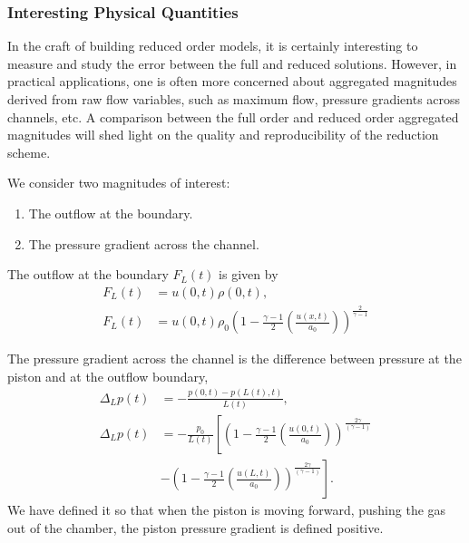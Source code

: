 \documentclass[../../thesis.tex]{subfiles}
\newcommand{\pexp}{\ensuremath{\frac{2\gamma}{\left(\gamma-1\right)}}}
\begin{document}

\subsubsection{Interesting Physical Quantities}
In the craft of building reduced order models, it is certainly interesting to measure and study the error between the full and reduced solutions. 
However, in practical applications, one is often more concerned about aggregated magnitudes derived from raw flow variables, such as maximum flow, pressure gradients across channels, etc. 
A comparison between the full order and reduced order aggregated magnitudes will shed light on the quality and reproducibility of the reduction scheme.

We consider two magnitudes of interest:
\begin{enumerate}
    \item The outflow at the boundary.
    \item The pressure gradient across the channel.
\end{enumerate}
The outflow at the boundary $F_L(t)$ is given by
\begin{subequations}
    \begin{align}
        F_L(t) &= u(0,t) \rho(0,t),
        \label{eq:outflow_at_the_boundary}
        \\  
        F_L(t) &= u(0,t) \rho_0 \left(1 - \frac{\gamma-1}{2}\left(\frac{u(x,t)}{a_0}\right)\right)^{\frac{2}{\gamma-1}}
    \end{align}
\end{subequations}

The pressure gradient across the channel is the difference between pressure at the piston and at the outflow boundary,
\begin{subequations}
    \begin{align}
        \Delta_L p(t) &= - \frac{p(0,t) - p(L(t),t)}{L(t)},
        \label{eq:channel_pressure_gradient} 
        \\ 
        \Delta_L p(t) &= 
        - \frac{p_0}{L(t)} 
        \left[
            \left(1 - \frac{\gamma-1}{2}\left(\frac{u(0,t)}{a_0}\right)\right)^{\pexp}
        \right.
        \\ 
        & - 
        \left.
            \left(1 - \frac{\gamma-1}{2}\left(\frac{u(L,t)}{a_0}\right)\right)^{\pexp}
        \right]
        . \nonumber
    \end{align}
\end{subequations}
We have defined it so that when the piston is moving forward, pushing the gas out of the chamber, the piston pressure gradient is defined positive.
\end{document}
